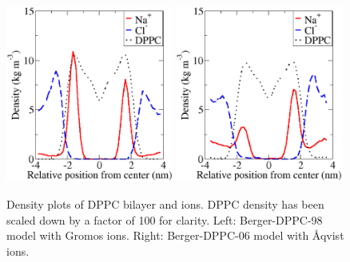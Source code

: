 \documentclass[pre,aps,floatfix,authordate1-4,twocolumn]{revtex4-1}
\begin{document}
\begin{figure}[]
  \centering
  \includegraphics[width=0.49\textwidth]{../Fig/ionnotscaledberger98.eps} %
  \includegraphics[width=0.49\textwidth]{../Fig/ionnotscaledberger06.eps} %
  \caption{\label{ionnotscaled}
    Density plots of DPPC bilayer and ions. DPPC density has been scaled down by a factor of 100 for clarity. Left: Berger-DPPC-98 model with Gromos ions. Right: Berger-DPPC-06 model with \r{A}qvist ions.
}
\end{figure}
\end{document}
